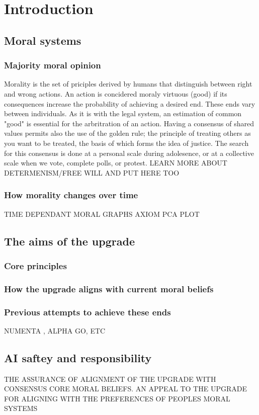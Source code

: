\chapter{Introduction}
\section{Moral systems}
\subsection{Majority moral opinion}
Morality is the set of priciples derived by humans that distinguish between right and wrong actions. An action is concidered moraly virtuous (good) if its consequences increase the probability of achieving a desired end. These ends vary between individuals. As it is with the legal system, an estimation of common "good" is essential for the arbritration of an action. Having a consensus of shared values permits also the use of the golden rule; the principle of treating others as you want to be treated, the basis of which forms the idea of justice. The search for this consensus is done at a personal scale during adolesence, or at a collective scale when we vote, complete polls, or protest.
LEARN MORE ABOUT DETERMENISM/FREE WILL AND PUT HERE TOO

\subsection{How morality changes over time}
TIME DEPENDANT MORAL GRAPHS
AXIOM PCA PLOT

\section{The aims of the upgrade}
\subsection{Core principles}
\subsection{How the upgrade aligns with current moral beliefs}
\subsection{Previous attempts to achieve these ends}
NUMENTA \cite{numentahome}, ALPHA GO, ETC
\section{AI saftey and responsibility}
THE ASSURANCE OF ALIGNMENT OF THE UPGRADE WITH CONSENSUS CORE MORAL BELIEFS.
AN APPEAL TO THE UPGRADE FOR ALIGNING WITH THE PREFERENCES OF PEOPLES MORAL SYSTEMS
